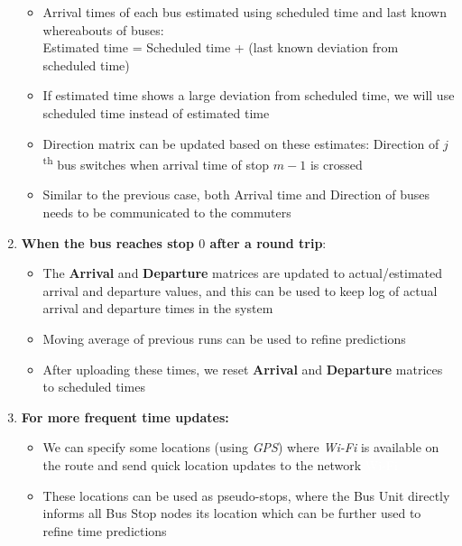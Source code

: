 \begin{enumerate}
          \begin{itemize}
              \item Arrival times of each bus estimated using scheduled time and last known whereabouts of buses:\\
                    Estimated time = Scheduled time + (last known deviation from scheduled
                    time)
              \item If estimated time shows a large deviation from scheduled time, we will use scheduled time instead of estimated time
              \item Direction matrix can be updated based on these estimates: Direction of $j$\textsuperscript{th} bus switches when arrival time of stop $m-1$ is crossed
              \item Similar to the previous case, both Arrival time and Direction of buses needs to be communicated to the commuters
          \end{itemize}
    \item \textbf{When the bus reaches stop $0$ after a \gls{round trip}}:
          \begin{itemize}
              \item  The \textbf{Arrival} and \textbf{Departure} matrices are updated to actual/estimated arrival and departure values, and this can be used to keep log of actual arrival and departure times in the system
              \item Moving average of previous runs can be used to refine predictions
              \item  After uploading these times, we reset \textbf{Arrival} and \textbf{Departure} matrices to scheduled times
          \end{itemize}
    \item \textbf{For more frequent time updates:}
          \begin{itemize}
              \item We can specify some locations (using \textit{\gls{GPS}}) where \textit{\gls{Wi-Fi}} is available on the route and send quick location updates to the network {\tiny \textcolor{white}{\ac{Wi-Fi}}}
              \item These locations can be used as pseudo-stops, where the Bus Unit directly informs all Bus Stop nodes its location which can be further used to refine time predictions
          \end{itemize}
\end{enumerate}
